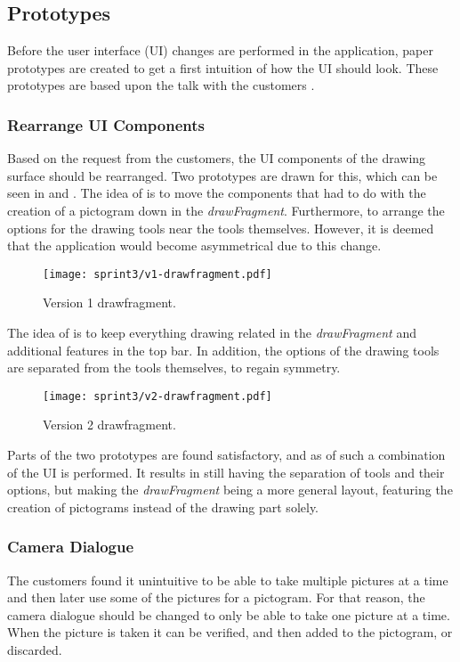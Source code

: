 \subsection{Prototypes}
Before the user interface (UI) changes are performed in the application, paper prototypes are created to get a first intuition of how the UI should look.
These prototypes are based upon the talk with the customers \citep{misc:drazenko, misc:pernille}.
 
\subsubsection*{Rearrange UI Components}
Based on the request from the customers, the UI components of the drawing surface should be rearranged.
Two prototypes are drawn for this, which can be seen in  and .
The idea of  is to move the components that had to do with the creation of a pictogram down in the \textit{drawFragment}. 
Furthermore, to arrange the options for the drawing tools near the tools themselves.
However, it is deemed that the application would become asymmetrical due to this change.

\begin{figure}[h]
     \centering
     \texttt{[image: sprint3/v1-drawfragment.pdf]}
     \caption{Version 1 drawfragment.}
     \label{fig:v1drawfrag}
\end{figure}

The idea of  is to keep everything drawing related in the \textit{drawFragment} and additional features in the top bar. 
In addition, the options of the drawing tools are separated from the tools themselves, to regain symmetry.

\begin{figure}[h]
     \centering
     \texttt{[image: sprint3/v2-drawfragment.pdf]}
     \caption{Version 2 drawfragment.}
     \label{fig:v2drawfrag}
\end{figure}

Parts of the two prototypes are found satisfactory, and as of such a combination of the UI is performed.
It results in still having the separation of tools and their options, but making the \textit{drawFragment} being a more general layout, featuring the creation of pictograms instead of the drawing part solely.

\subsubsection*{Camera Dialogue}
The customers found it unintuitive to be able to take multiple pictures at a time and then later use some of the pictures for a pictogram.
For that reason, the camera dialogue should be changed to only be able to take one picture at a time.
When the picture is taken it can be verified, and then added to the pictogram, or discarded.

